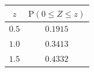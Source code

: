 {\setlength{\tabcolsep}{4pt}\renewcommand{\arraystretch}{1.3}\small%
\begin{tabular}{|c|c|}
\hline
$z$ & $\mathrm{P}(0\le Z\le z)$ \\
\hline
$0.5$ & $0.1915$ \\
\hline
$1.0$ & $0.3413$ \\
\hline
$1.5$ & $0.4332$ \\
\hline
\end{tabular}}
